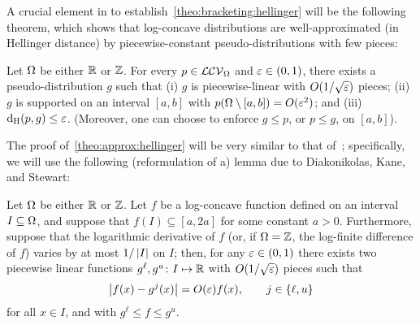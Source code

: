A crucial element in to establish~\cref{theo:bracketing:hellinger} will be the following theorem, which shows that log-concave distributions are well-approximated (in Hellinger distance) by piecewise-constant pseudo-distributions with few pieces:
 \begin{theorem}\label{theo:approx:hellinger}
  Let $\domain$ be either $\R$ or $\Z$. For every $p\in\classlogconcave[\domain]$ and $\eps\in(0,1)$, there exists a pseudo-distribution $g$ such that (i) $g$ is piecewise-linear with $\bigO{1/\sqrt{\eps}}$ pieces; (ii) $g$ is supported on an interval $[a,b]$ with $p(\domain\setminus[a,b]) = O(\eps^2)$; and (iii) $\hellinger{p}{g}\leq \eps$. (Moreover, one can choose to enforce $g\leq p$, or $p\leq g$, on $[a,b]$).
\end{theorem}

The proof of~\cref{theo:approx:hellinger} will be very similar to that of~\cite[Theorem 12]{DKS:16}; specifically, we will use the following (reformulation of a) lemma due to Diakonikolas, Kane, and Stewart:
\begin{lemma}\label{lemma:logconcave:pointwise:approx}
  Let $\domain$ be either $\R$ or $\Z$. Let $f$ be a log-concave function defined on an interval $I\subseteq \domain$, and suppose that $f(I)\subseteq [a,2a]$ for some constant $a>0$. Furthermore, suppose that the logarithmic derivative of $f$ (or, if $\domain=\Z$, the log-finite difference of $f$) varies by at most $1/\abs{I}$ on $I$; then, for any $\eps\in(0,1)$ there exists two piecewise linear functions $g^\ell,g^u\colon I\mapsto \R$ with $\bigO{1/\sqrt{\eps}}$ pieces such that
  \begin{equation}\label{eq:logconcave:pointwise:approx}
      \abs{f(x)-g^j(x)} = \bigO{\eps}f(x), \qquad j\in\{\ell,u\}
  \end{equation}
  for all $x\in I$, and with $g^\ell\leq f\leq g^u$.
\end{lemma}
